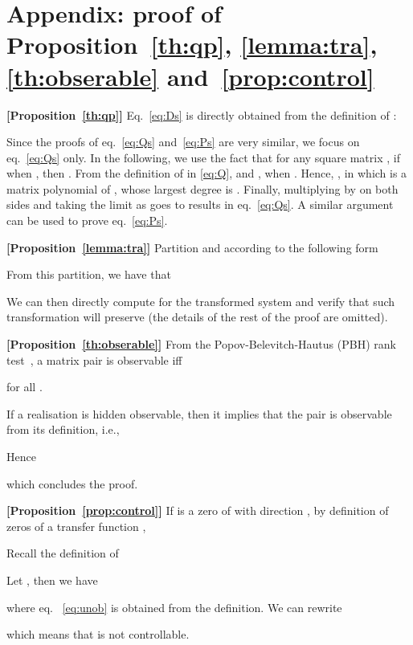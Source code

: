 \documentclass[twocolumn,12pt]{autart}
\theoremstyle{plain}
\newenvironment{proof}[1][Proof]{\begin{trivlist} \item[\hskip \labelsep {\bfseries #1}]}{\end{trivlist}}
\begin{document}
\section{Appendix: proof of Proposition~\ref{th:qp}, \ref{lemma:tra}, \ref{th:obserable} and~\ref{prop:control}}\label{sec:appendixA}
\begin{proof}\textbf{[Proposition~\ref{th:qp}]}
Eq.~\eqref{eq:Ds} is directly obtained from the definition of :

Since the proofs of eq.~\eqref{eq:Qs} and~\eqref{eq:Ps} are very
similar, we focus on eq.~\eqref{eq:Qs} only. In the following, we use the fact that
for any square matrix , if  when , then  
. From the definition of  in \eqref{eq:Q},
 and
, when .
Hence,
, in
which  is a matrix polynomial of , whose largest degree is
. Finally, multiplying by  on both sides and taking the limit
as  goes to  results in eq.~\eqref{eq:Qs}.  A similar
argument can be used to prove eq.~\eqref{eq:Ps}.
\end{proof}


\begin{proof}\textbf{[Proposition~\ref{lemma:tra}]}
Partition  and  according to the following form

From this partition, we have that 

We can then directly compute  for the transformed system and verify that such transformation will preserve  (the details of the rest of the proof are omitted).
\end{proof}



\begin{proof}
\textbf{[Proposition~\ref{th:obserable}]}
From the Popov-Belevitch-Hautus (PBH) rank test~\cite{zdg}, a matrix pair
   is observable iff
  
  for all . 
  
   If a realisation is hidden observable, then it implies that the
  pair  is observable from its definition, i.e.,
  
  Hence
  
  which concludes the proof. 
  \end{proof}

\begin{proof}
\textbf{[Proposition~\ref{prop:control}]}
If  is a zero of  with direction , by definition of zeros of a transfer function \cite{zdg},

Recall the definition of 

Let , then we have 

where eq. ~\eqref{eq:unob} is obtained from the definition.
We can rewrite

which means that  is not controllable.
\end{proof}
\end{document}

